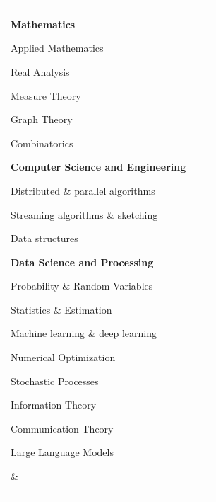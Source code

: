 \begin{tabular}[t]{@{}p{\textwidth-\rcollength-3.5\spacewidth}@{}p{\spacewidth}@{}p{\rcollength}}%

\parbox{1.5\rcollength}{%
\textbf{Mathematics}
\begin{innerlist}
	\item[] Applied Mathematics
	\item[] Real Analysis
	\item[] Measure Theory
	\item[] Graph Theory
	\item[] Combinatorics
\end{innerlist}
%
\textbf{Computer Science and Engineering}
\begin{innerlist}
	\item[] Distributed \& parallel algorithms
	\item[] Streaming algorithms \& sketching
	\item[] Data structures
\end{innerlist}
\textbf{Data Science and Processing}
%
\begin{innerlist}
    \item[] Probability \& Random Variables
    \item[] Statistics \& Estimation
	\item[] Machine learning \& deep learning
	\item[] Numerical Optimization
    \item[] Stochastic Processes
    \item[] Information Theory
    \item[] Communication Theory
    \item[] Large Language Models
\end{innerlist}
}

&


\end{tabular}
